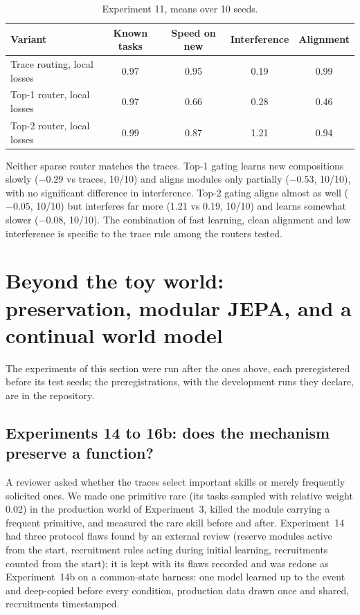 \documentclass[11pt,a4paper]{article}
\begin{document}
\begin{table}[h]
\centering\small\setlength{\tabcolsep}{5pt}
\begin{tabular}{lcccc}
\toprule
Variant & Known tasks & Speed on new & Interference & Alignment \\
\midrule
Trace routing, local losses & 0.97 & 0.95 & 0.19 & 0.99 \\
Top-1 router, local losses & 0.97 & 0.66 & 0.28 & 0.46 \\
Top-2 router, local losses & 0.99 & 0.87 & 1.21 & 0.94 \\
\bottomrule
\end{tabular}
\caption{Experiment 11, means over 10 seeds.}
\label{tab:exp11}
\end{table}

Neither sparse router matches the traces. Top-1 gating learns new compositions slowly ($-0.29$ vs traces, 10/10) and aligns modules only partially ($-0.53$, 10/10), with no significant difference in interference. Top-2 gating aligns almost as well ($-0.05$, 10/10) but interferes far more (1.21 vs 0.19, 10/10) and learns somewhat slower ($-0.08$, 10/10). The combination of fast learning, clean alignment and low interference is specific to the trace rule among the routers tested.


\section{Beyond the toy world: preservation, modular JEPA, and a continual world model}
\label{sec:beyond}

The experiments of this section were run after the ones above, each preregistered before its test seeds; the preregistrations, with the development runs they declare, are in the repository.

\subsection{Experiments 14 to 16b: does the mechanism preserve a function?}

A reviewer asked whether the traces select important skills or merely frequently solicited ones. We made one primitive rare (its tasks sampled with relative weight 0.02) in the production world of Experiment~3, killed the module carrying a frequent primitive, and measured the rare skill before and after. Experiment~14 had three protocol flaws found by an external review (reserve modules active from the start, recruitment rules acting during initial learning, recruitments counted from the start); it is kept with its flaws recorded and was redone as Experiment~14b on a common-state harness: one model learned up to the event and deep-copied before every condition, production data drawn once and shared, recruitments timestamped.
\end{document}
